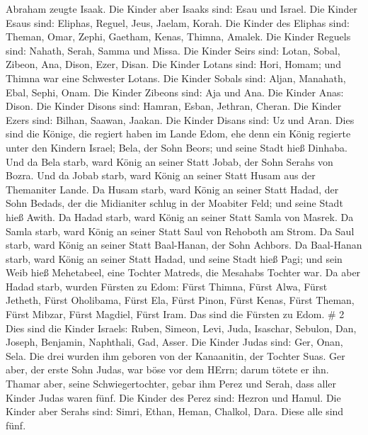  Abraham zeugte Isaak. Die Kinder aber Isaaks sind: Esau
und Israel.  Die Kinder Esaus sind: Eliphas, Reguel, Jeus,
Jaelam, Korah.  Die Kinder des Eliphas sind: Theman, Omar,
Zephi, Gaetham, Kenas, Thimna, Amalek.  Die Kinder Reguels
sind: Nahath, Serah, Samma und Missa.  Die Kinder Seirs
sind: Lotan, Sobal, Zibeon, Ana, Dison, Ezer, Disan.  Die
Kinder Lotans sind: Hori, Homam; und Thimna war eine Schwester Lotans.
 Die Kinder Sobals sind: Aljan, Manahath, Ebal, Sephi,
Onam. Die Kinder Zibeons sind: Aja und Ana.  Die Kinder
Anas: Dison. Die Kinder Disons sind: Hamran, Esban, Jethran, Cheran.
 Die Kinder Ezers sind: Bilhan, Saawan, Jaakan. Die Kinder
Disans sind: Uz und Aran.  Dies sind die Könige, die
regiert haben im Lande Edom, ehe denn ein König regierte unter den
Kindern Israel; Bela, der Sohn Beors; und seine Stadt hieß Dinhaba.
 Und da Bela starb, ward König an seiner Statt Jobab, der
Sohn Serahs von Bozra.  Und da Jobab starb, ward König an
seiner Statt Husam aus der Themaniter Lande.  Da Husam
starb, ward König an seiner Statt Hadad, der Sohn Bedads, der die
Midianiter schlug in der Moabiter Feld; und seine Stadt hieß Awith.
 Da Hadad starb, ward König an seiner Statt Samla von
Masrek.  Da Samla starb, ward König an seiner Statt Saul
von Rehoboth am Strom.  Da Saul starb, ward König an seiner
Statt Baal-Hanan, der Sohn Achbors.  Da Baal-Hanan starb,
ward König an seiner Statt Hadad, und seine Stadt hieß Pagi; und sein
Weib hieß Mehetabeel, eine Tochter Matreds, die Mesahabs Tochter war.
 Da aber Hadad starb, wurden Fürsten zu Edom: Fürst Thimna,
Fürst Alwa, Fürst Jetheth,  Fürst Oholibama, Fürst Ela,
Fürst Pinon,  Fürst Kenas, Fürst Theman, Fürst Mibzar,
 Fürst Magdiel, Fürst Iram. Das sind die Fürsten zu Edom.
\# 2  Dies sind die Kinder Israels: Ruben, Simeon, Levi,
Juda, Isaschar, Sebulon,  Dan, Joseph, Benjamin, Naphthali,
Gad, Asser.  Die Kinder Judas sind: Ger, Onan, Sela. Die
drei wurden ihm geboren von der Kanaanitin, der Tochter Suas. Ger aber,
der erste Sohn Judas, war böse vor dem HErrn; darum tötete er ihn.
 Thamar aber, seine Schwiegertochter, gebar ihm Perez und
Serah, dass aller Kinder Judas waren fünf.  Die Kinder des
Perez sind: Hezron und Hamul.  Die Kinder aber Serahs sind:
Simri, Ethan, Heman, Chalkol, Dara. Diese alle sind fünf. 
